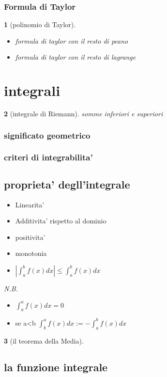\documentclass{article}
\theoremstyle{mystyle}
\newtheorem*{mydefinition}{}
\begin{document}
\subsubsection{Formula di Taylor}
\begin{mydefinition}[polinomio di Taylor]
    \begin{itemize}
        \item formula di taylor con il resto di peano
        \item formula di taylor con il resto di lagrange
    \end{itemize}
\end{mydefinition}

\section{integrali}
\begin{mydefinition}[integrale di Riemann]
    somme inferiori e superiori
\end{mydefinition}
\subsubsection{significato geometrico}
\subsubsection{criteri di integrabilita'}
\subsection{proprieta' degll'integrale}
\begin{itemize}
    \item Linearita'
    \item Additivita' rispetto al dominio
    \item positivita'
    \item monotonia
    \item $|\int_a^bf(x)dx|\leq \int_a^bf(x)dx$
\end{itemize}
\emph{N.B.}\begin{itemize}
    \item $\int_a^af(x)dx=0$
    \item se a<b $\int^a_bf(x)dx:=-\int^b_af(x)dx$
\end{itemize}
\begin{mydefinition}[il teorema della Media]
    
\end{mydefinition}
\subsection{la funzione integrale}
\end{document}

